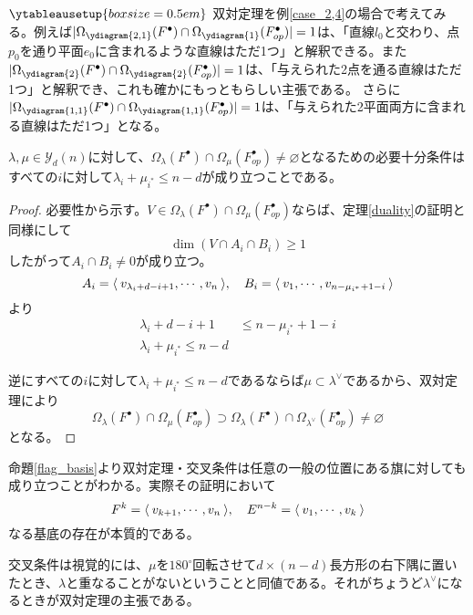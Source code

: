 \documentclass{ltjsreport}
\begin{document}
\begin{eg}
  $\ytableausetup{boxsize=0.5em}$
  双対定理を例\ref{case_2,4}の場合で考えてみる。例えば$|\Omega_{\ydiagram{2,1}}(F^\bullet)\cap\Omega_{\ydiagram{1}}(F^\bullet_{op})|=1$は、「直線$l_0$と交わり、点$p_0$を通り平面$e_0$に含まれるような直線はただ1つ」と解釈できる。また$|\Omega_{\ydiagram{2}}(F^\bullet)\cap\Omega_{\ydiagram{2}}(F^\bullet_{op})|=1$は、「与えられた2点を通る直線はただ1つ」と解釈でき、これも確かにもっともらしい主張である。 さらに$|\Omega_{\ydiagram{1,1}}(F^\bullet)\cap\Omega_{\ydiagram{1,1}}(F^\bullet_{op})|=1$は、「与えられた2平面両方に含まれる直線はただ1つ」となる。
\end{eg}

\begin{cor}[交叉条件]\label{condition}
  $\lambda,\mu\in\mathcal{Y}_d(n)$に対して、$\Omega_{\lambda}(F^\bullet)\cap\Omega_{\mu}(F^\bullet_{op})\neq\varnothing$となるための必要十分条件はすべての$i$に対して$\lambda_i+\mu_{i^*}\leq n-d$が成り立つことである。
\end{cor}

\begin{proof}
  必要性から示す。$V\in\Omega_\lambda(F^\bullet)\cap\Omega_{\mu}(F^\bullet_{op})$ならば、定理\ref{duality}の証明と同様にして
  \[
  \dim (V\cap A_i\cap B_i)\geq 1
  \]
  したがって$A_i\cap B_i\neq 0$が成り立つ。
  \[
  A_i=\langle\:v_{\lambda_i+d-i+1},\cdots,v_n\:\rangle,\quad B_i=\langle\:v_1,\cdots,v_{n-\mu_{i^*}+1-i}\:\rangle  
  \]
  より
  \begin{align*}
    \lambda_i+d-i+1&\leq n-\mu_{i^*}+1-i\\
    \lambda_i+\mu_{i^*}\leq n-d
  \end{align*}

  逆にすべての$i$に対して$\lambda_i+\mu_{i^*}\leq n-d$であるならば$\mu\subset \lambda^\vee$であるから、双対定理により
  \[
  \Omega_{\lambda}(F^\bullet)\cap\Omega_{\mu}(F^\bullet_{op})\supset \Omega_{\lambda}(F^\bullet)\cap\Omega_{\lambda^\vee}(F^\bullet_{op})\neq \varnothing  
  \]
  となる。
\end{proof}

命題\ref{flag_basis}より双対定理・交叉条件は任意の一般の位置にある旗に対しても成り立つことがわかる。実際その証明において
\[
  F^k=\langle\:v_{k+1},\cdots,v_n\:\rangle, \quad E^{n-k}=\langle\:v_1,\cdots,v_k\:\rangle  
\]
なる基底の存在が本質的である。

交叉条件は視覚的には、$\mu$を$180^\circ$回転させて$d\times (n-d)$長方形の右下隅に置いたとき、$\lambda$と重なることがないということと同値である。それがちょうど$\lambda^\vee$になるときが双対定理の主張である。
\end{document}
